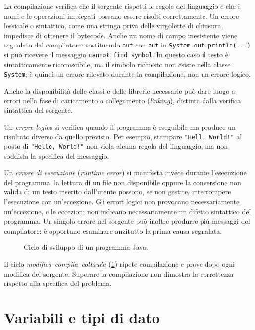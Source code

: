 La compilazione verifica che il sorgente rispetti le regole del
linguaggio e che i nomi e le operazioni impiegati possano essere
risolti correttamente. Un errore lessicale o sintattico, come
una stringa priva delle virgolette di chiusura, impedisce di
ottenere il bytecode. Anche un nome di campo inesistente viene
segnalato dal compilatore: sostituendo \texttt{out} con
\texttt{aut} in \texttt{System.out.println(...)} si può ricevere
il messaggio \texttt{cannot find symbol}. In questo caso il testo
è sintatticamente riconoscibile, ma il simbolo richiesto non
esiste nella classe \texttt{System}; è quindi un errore
rilevato durante la compilazione, non un errore logico.

Anche la disponibilità delle classi e delle librerie necessarie
può dare luogo a errori nella fase di caricamento o collegamento
(\emph{linking}), distinta dalla verifica sintattica del sorgente.

Un \emph{errore logico} si verifica quando il programma è eseguibile
ma produce un risultato diverso da quello previsto. Per esempio,
stampare \texttt{"Hell, World!"} al posto di
\texttt{"Hello, World!"} non viola alcuna regola del linguaggio,
ma non soddisfa la specifica del messaggio.

Un \emph{errore di esecuzione} (\emph{runtime error}) si manifesta
invece durante l'esecuzione del programma: la lettura di un file
non disponibile oppure la conversione non valida di un testo
inserito dall'utente possono, se non gestite, interrompere
l'esecuzione con un'eccezione. Gli errori logici non provocano
necessariamente un'eccezione, e le eccezioni non indicano
necessariamente un difetto sintattico del programma.
Un singolo errore nel sorgente può inoltre produrre più
messaggi del compilatore: è opportuno esaminare anzitutto
la prima causa segnalata.

\begin{figure}[htbp]
  \centering
  
  \caption{Ciclo di sviluppo di un programma Java.}
  \label{fig:fi-java-ciclo-sviluppo}
\end{figure}

Il ciclo \emph{modifica--compila--collauda}
(\cref{fig:fi-java-ciclo-sviluppo}) ripete compilazione e prove
dopo ogni modifica del sorgente. Superare la compilazione non
dimostra la correttezza rispetto alla specifica del problema.

\section{Variabili e tipi di dato}
\label{sec:fi-java-variabili}

